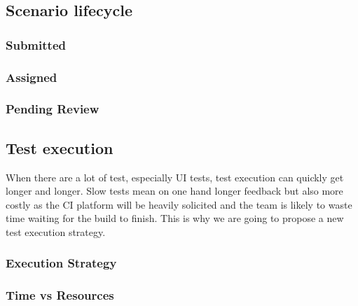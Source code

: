 \subsection{Scenario lifecycle}\label{subsec:scenario-lifecycle}

\subsubsection{Submitted}

\subsubsection{Assigned}

\subsubsection{Pending Review}

\subsection{Test execution}\label{subsec:test-execution}
When there are a lot of test, especially UI tests, test execution can quickly
get longer and longer.
Slow tests mean on one hand longer feedback but also more costly as the CI
platform will be heavily solicited and the team is likely to waste time waiting
for the build to finish.
This is why we are going to propose a new test execution strategy.

\subsubsection{Execution Strategy}

\subsubsection{Time vs Resources}
